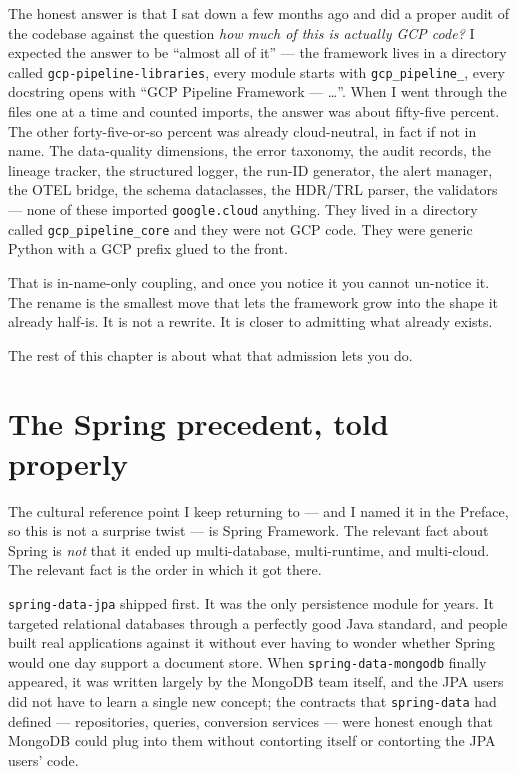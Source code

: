 \documentclass[
  11pt,
  british,
  oneside]{book}
\begin{document}
The honest answer is that I sat down a few months ago and did a proper
audit of the codebase against the question \emph{how much of this is
actually GCP code?} I expected the answer to be ``almost all of it'' ---
the framework lives in a directory called
\texttt{gcp-pipeline-libraries}, every module starts with
\texttt{gcp\_pipeline\_}, every docstring opens with ``GCP Pipeline
Framework --- \ldots{}''. When I went through the files one at a time
and counted imports, the answer was about fifty-five percent. The other
forty-five-or-so percent was already cloud-neutral, in fact if not in
name. The data-quality dimensions, the error taxonomy, the audit
records, the lineage tracker, the structured logger, the run-ID
generator, the alert manager, the OTEL bridge, the schema dataclasses,
the HDR/TRL parser, the validators --- none of these imported
\texttt{google.cloud} anything. They lived in a directory called
\texttt{gcp\_pipeline\_core} and they were not GCP code. They were
generic Python with a GCP prefix glued to the
front.

That is in-name-only coupling, and once you notice it you cannot
un-notice it. The rename is the smallest move that lets the framework
grow into the shape it already half-is. It is not a rewrite. It is
closer to admitting what already exists.

The rest of this chapter is about what that admission lets you do.

\hypertarget{the-spring-precedent-told-properly}{%
\section{The Spring precedent, told
properly}\label{the-spring-precedent-told-properly}}

The cultural reference point I keep returning to --- and I named it in
the Preface, so this is not a surprise twist --- is Spring
Framework. The relevant fact about Spring is
\emph{not} that it ended up multi-database, multi-runtime, and
multi-cloud. The relevant fact is the order in which it got there.

\texttt{spring-data-jpa} shipped first. It was the only persistence
module for years. It targeted relational databases through a perfectly
good Java standard, and people built real applications against it
without ever having to wonder whether Spring would one day support a
document store. When \texttt{spring-data-mongodb} finally appeared, it
was written largely by the MongoDB team itself, and the JPA users did
not have to learn a single new concept; the contracts that
\texttt{spring-data} had defined --- repositories, queries, conversion
services --- were honest enough that MongoDB could plug into them
without contorting itself or contorting the JPA users' code.
\end{document}
